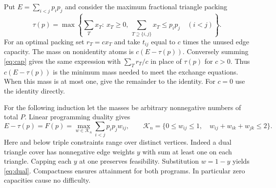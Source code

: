 \documentclass[11pt]{article}
\newcommand{\K}{\mathcal K}
\begin{document}
Put $E=\sum_{i<j}p_i p_j$ and consider the maximum fractional triangle packing
\begin{equation}\label{eq:pack}
 \tau(p)=\max\left\{\sum_T x_T:\ x_T\ge0,\
       \sum_{T\supseteq\{i,j\}}x_T\le p_i p_j\quad(i<j)\right\}.
\end{equation}
For an optimal packing set $r_T=cx_T$ and take $t_{ij}$ equal to $c$ times the unused edge capacity. The mass on nonidentity atoms is $c(E-\tau(p))$. Conversely summing \eqref{eq:cap} gives the same expression with $\sum_T r_T/c$ in place of $\tau(p)$ for $c>0$. Thus $c(E-\tau(p))$ is the minimum mass needed to meet the exchange equations. When this mass is at most one, give the remainder to the identity. For $c=0$ use the identity directly.

For the following induction let the masses be arbitrary nonnegative numbers of total $P$. Linear programming duality gives
\begin{equation}\label{eq:dual}
 E-\tau(p)=F(p)=
 \max_{w\in\K_n}\sum_{i<j}p_i p_j w_{ij},\qquad
 \K_n=\{0\le w_{ij}\le1,\quad w_{ij}+w_{ik}+w_{jk}\le2\}.
\end{equation}
Here and below triple constraints range over distinct vertices. Indeed a dual triangle cover has nonnegative edge weights $y$ with sum at least one on each triangle. Capping each $y$ at one preserves feasibility. Substitution $w=1-y$ yields \eqref{eq:dual}. Compactness ensures attainment for both programs. In particular zero capacities cause no difficulty.
\end{document}
